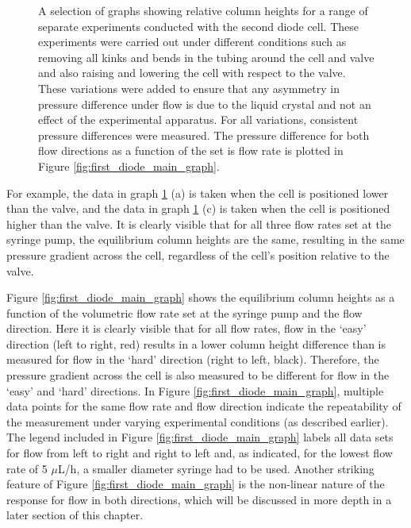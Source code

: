 \begin{figure}
\begin{center}
\end{center}
\caption[Preliminary column heights for different experimental setups]{\label{fig:first_diode_small_graphs}A selection of graphs showing relative column heights for a range of separate experiments conducted with the second diode cell. These experiments were carried out under different conditions such as removing all kinks and bends in the tubing around the cell and valve and also raising and lowering the cell with respect to the valve. These variations were added to ensure that any asymmetry in pressure difference under flow is due to the liquid crystal and not an effect of the experimental apparatus. For all variations, consistent pressure differences were measured. The pressure difference for both flow directions as a function of the set is flow rate is plotted in Figure \ref{fig:first_diode_main_graph}.}
\end{figure}

For example, the data in graph \ref{fig:first_diode_small_graphs} (a) is taken when the cell is positioned lower than the valve, and the data in graph \ref{fig:first_diode_small_graphs} (c) is taken when the cell is positioned higher than the valve. It is clearly visible that for all three flow rates set at the syringe pump, the equilibrium column heights are the same, resulting in the same pressure gradient across the cell, regardless of the cell's position relative to the valve.

Figure \ref{fig:first_diode_main_graph} shows the equilibrium column heights as a function of the volumetric flow rate set at the syringe pump and the flow direction. Here it is clearly visible that for all flow rates, flow in the `easy' direction (left to right, red) results in a lower column height difference than is measured for flow in the `hard' direction (right to left, black). Therefore, the pressure gradient across the cell is also measured to be different for flow in the `easy' and `hard' directions. In Figure \ref{fig:first_diode_main_graph}, multiple data points for the same flow rate and flow direction indicate the repeatability of the measurement under varying experimental conditions (as described earlier). The legend included in Figure \ref{fig:first_diode_main_graph} labels all data sets for flow from left to right and right to left and, as indicated, for the lowest flow rate of 5 $\mu$L/h, a smaller diameter syringe had to be used. Another striking feature of Figure \ref{fig:first_diode_main_graph} is the non-linear nature of the response for flow in both directions, which will be discussed in more depth in a later section of this chapter.

